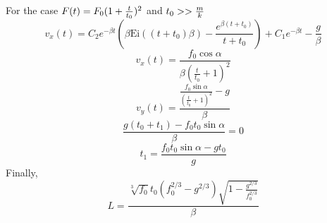 \documentclass[a4paper,11pt]{scrartcl}
\begin{document}
For the case $F(t) = F_0 (1 + {t \over t_0})^2$ and $t_0 >> {m \over k} $
\begin{equation}
v_x(t) = C_2 e^{- \beta t} \left(\beta  \text{Ei}((t+t_0) \beta )-\frac{e^{\beta  (t+t_0)}}{t+t_0}\right)+C_1 e^{- \beta t}-\frac{g}{\beta }
\end{equation}
\begin{equation}
v_x(t) = \frac{f_0   \cos \alpha}{\beta  \left(\frac{t}{t_0}+1\right)^2}
\end{equation}
\begin{equation}
v_y(t) = \frac{\frac{f_0  \sin \alpha }{\left(\frac{t}{t_0}+1\right)^2}-g}{\beta }
\end{equation}
\begin{equation}
\frac{g (t_0+t_1)-f_0 t_0   \sin \alpha}{\beta }=0
\end{equation}
\begin{equation}
t_1 = \frac{f_0 t_0  \sin \alpha - g t_0}{g}
\end{equation}
Finally, 
\begin{equation}
L = \frac{\sqrt[3]{f_0} t_0 \left(f_0^{2/3}-g^{2/3}\right) \sqrt{1-\frac{g^{2/3}}{f_0^{2/3}}}}{\beta } 
\end{equation}
\end{document}
